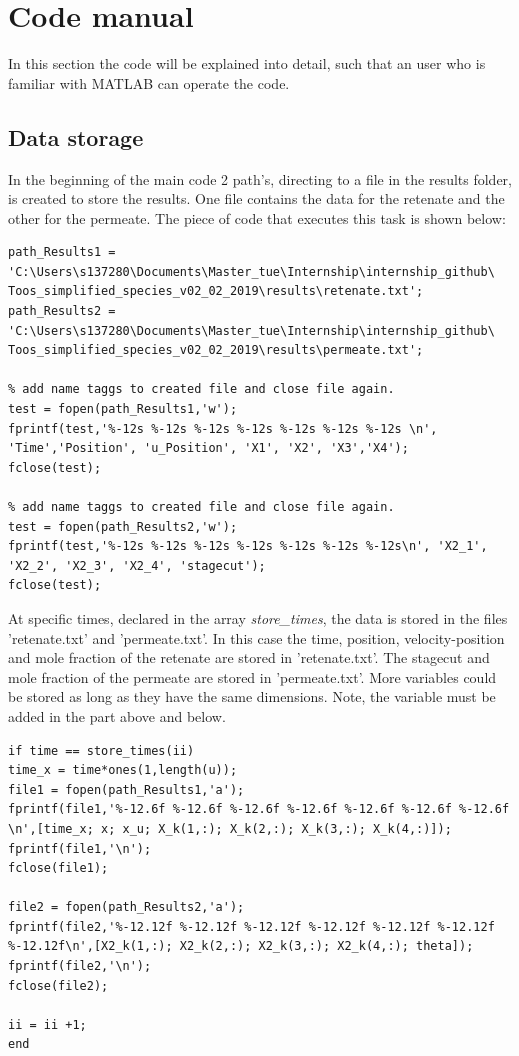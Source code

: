 \section{Code manual}
In this section the code will be explained into detail, such that an user who is familiar with MATLAB can operate the code. 

\subsection{Data storage}
In the beginning of the main code 2 path's, directing to a file in the results folder, is created to store the results. One file contains the data for the retenate and the other for the permeate. The piece of code that executes this task is shown below:

\begin{lstlisting}[firstnumber={17}]
%% set path to folder where values must be stored, clean the old file
path_Results1 = 'C:\Users\s137280\Documents\Master_tue\Internship\internship_github\ Toos_simplified_species_v02_02_2019\results\retenate.txt';
path_Results2 = 'C:\Users\s137280\Documents\Master_tue\Internship\internship_github\ Toos_simplified_species_v02_02_2019\results\permeate.txt';

% add name taggs to created file and close file again.
test = fopen(path_Results1,'w');
fprintf(test,'%-12s %-12s %-12s %-12s %-12s %-12s %-12s \n', 'Time','Position', 'u_Position', 'X1', 'X2', 'X3','X4');
fclose(test);

% add name taggs to created file and close file again.
test = fopen(path_Results2,'w');
fprintf(test,'%-12s %-12s %-12s %-12s %-12s %-12s %-12s\n', 'X2_1', 'X2_2', 'X2_3', 'X2_4', 'stagecut');
fclose(test);
\end{lstlisting}

At specific times, declared in the array \textit{store\_times}, the data is stored in the files 'retenate.txt' and 'permeate.txt'. In this case the time, position, velocity-position and mole fraction of the retenate are stored in 'retenate.txt'. The stagecut and mole fraction of the permeate are stored in 'permeate.txt'. More variables could be stored as long as they have the same dimensions. Note, the variable must be added in the part above and below. 
   
\begin{lstlisting}[firstnumber={120}]
%     store data at different time steps
if time == store_times(ii)
time_x = time*ones(1,length(u));
file1 = fopen(path_Results1,'a');
fprintf(file1,'%-12.6f %-12.6f %-12.6f %-12.6f %-12.6f %-12.6f %-12.6f \n',[time_x; x; x_u; X_k(1,:); X_k(2,:); X_k(3,:); X_k(4,:)]);    
fprintf(file1,'\n');        
fclose(file1);

file2 = fopen(path_Results2,'a');
fprintf(file2,'%-12.12f %-12.12f %-12.12f %-12.12f %-12.12f %-12.12f %-12.12f\n',[X2_k(1,:); X2_k(2,:); X2_k(3,:); X2_k(4,:); theta]);    
fprintf(file2,'\n');        
fclose(file2);        

ii = ii +1;
end
\end{lstlisting} 
